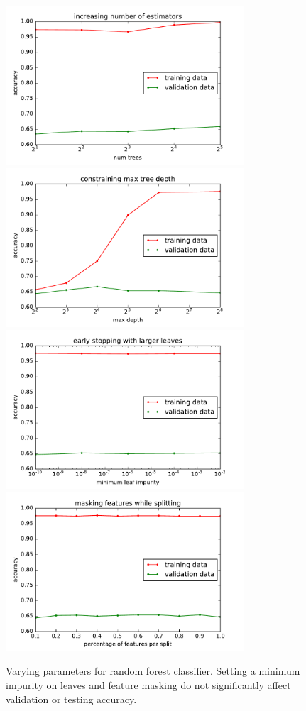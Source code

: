 \documentclass{article}
\begin{document}
\begin{multicols}{2}
\begin{figure}[t]
   \centering
   \includegraphics[width=3.5in]{img/rf-numEstimators.pdf}\hspace{-.1in}
   \includegraphics[width=3.5in]{img/rf-maxTreeDepth.pdf}
   \includegraphics[width=3.5in]{img/rf-impurity.pdf}\hspace{-.1in}
   \includegraphics[width=3.5in]{img/rf-maskingFeatures.pdf}
   \caption{Varying parameters for random forest classifier.
   Setting a minimum impurity on leaves and feature masking
   do not significantly affect validation or testing accuracy.
   }
   \label{fig:rf-params}
\end{figure}


\end{multicols}
\end{document}
